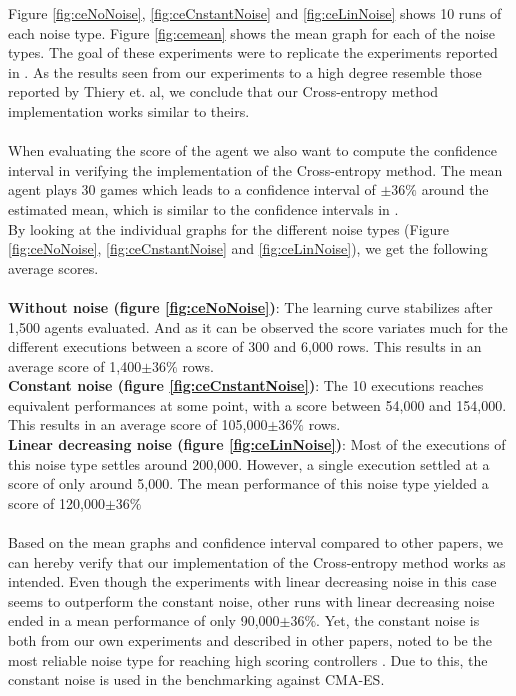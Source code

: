 Figure \ref{fig:ceNoNoise}, \ref{fig:ceCnstantNoise} and
\ref{fig:ceLinNoise} shows 10 runs of each noise type. Figure
\ref{fig:cemean} shows the mean graph for each of the noise types.
The goal of these experiments were to replicate the experiments 
reported in \citep{scherrer2009}. As the results seen from our experiments
to a high degree resemble those reported by Thiery et. al, we conclude
that our Cross-entropy method implementation works similar to theirs.\\
\\
When evaluating the score of the agent we also want to compute the confidence
interval in verifying the implementation of the Cross-entropy method. The mean agent plays 30 games
which leads to a confidence interval of $\pm36\%$ around the estimated mean,
which is similar to the confidence intervals in \citep{scherrer2009}.\\
By looking at the individual graphs for the different noise types 
(Figure \ref{fig:ceNoNoise}, \ref{fig:ceCnstantNoise} and
\ref{fig:ceLinNoise}), we get the following average scores.\\
\\
\textbf{Without noise (figure \ref{fig:ceNoNoise})}: The learning curve
stabilizes after 1,500 agents evaluated. And as it can be observed the
score variates much for the different executions between a score of 300 and 6,000
rows. This results in an average score of 1,400$\pm36\%$ rows.\\
\textbf{Constant noise (figure \ref{fig:ceCnstantNoise})}: 
The 10 executions reaches equivalent performances at some point, 
with a score between
54,000 and 154,000. This results in an average score of 105,000$\pm36\%$ rows.\\
\textbf{Linear decreasing noise (figure \ref{fig:ceLinNoise})}:
Most of the executions of this noise type settles around 200,000.
However, a single execution settled at a score of only around 5,000.
The mean performance of this noise type yielded a score of
120,000$\pm36\%$ \\\\

Based on the mean graphs and confidence interval compared to other papers, we can
hereby verify that our implementation of the Cross-entropy method works as intended. Even though the
experiments with linear decreasing noise in this case seems to outperform
the constant noise, other runs with linear decreasing noise ended in a mean 
performance of only 90,000$\pm36\%$. Yet, the constant noise is both from our
own experiments and described in other papers, noted to be the most reliable
noise type for reaching high scoring controllers \citep{scherrer2009}. 
Due to this, the constant noise is used in the 
benchmarking against CMA-ES.


